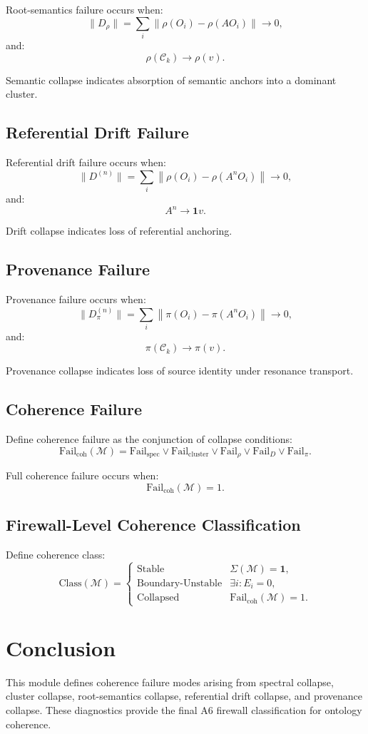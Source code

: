 Root-semantics failure occurs when:
\[
\|D_{\rho}\| = \sum_i \left\| \rho(O_i) - \rho(A O_i) \right\| \to 0,
\]
and:
\[
\rho(\mathcal{C}_k) \to \rho(v).
\]

Semantic collapse indicates absorption of semantic anchors into a dominant
cluster.

\subsection{Referential Drift Failure}

Referential drift failure occurs when:
\[
\|D^{(n)}\| = \sum_i \left\| \rho(O_i) - \rho(A^n O_i) \right\| \to 0,
\]
and:
\[
A^n \to \mathbf{1} v.
\]

Drift collapse indicates loss of referential anchoring.

\subsection{Provenance Failure}

Provenance failure occurs when:
\[
\|D_{\pi}^{(n)}\| = \sum_i \left\| \pi(O_i) - \pi(A^n O_i) \right\| \to 0,
\]
and:
\[
\pi(\mathcal{C}_k) \to \pi(v).
\]

Provenance collapse indicates loss of source identity under resonance
transport.

\subsection{Coherence Failure}

Define coherence failure as the conjunction of collapse conditions:
\[
\mathrm{Fail}_{\mathrm{coh}}(\mathcal{M}) =
\mathrm{Fail}_{\mathrm{spec}}
\lor \mathrm{Fail}_{\mathrm{cluster}}
\lor \mathrm{Fail}_{\rho}
\lor \mathrm{Fail}_{D}
\lor \mathrm{Fail}_{\pi}.
\]

Full coherence failure occurs when:
\[
\mathrm{Fail}_{\mathrm{coh}}(\mathcal{M}) = 1.
\]

\subsection{Firewall-Level Coherence Classification}

Define coherence class:
\[
\mathrm{Class}(\mathcal{M}) =
\begin{cases}
\mathrm{Stable} & \Sigma(\mathcal{M}) = \mathbf{1}, \\
\mathrm{Boundary\text{-}Unstable} & \exists i : E_i = 0, \\
\mathrm{Collapsed} & \mathrm{Fail}_{\mathrm{coh}}(\mathcal{M}) = 1.
\end{cases}
\]

\section{Conclusion}

This module defines coherence failure modes arising from spectral collapse,
cluster collapse, root-semantics collapse, referential drift collapse, and
provenance collapse. These diagnostics provide the final A6 firewall
classification for ontology coherence.
